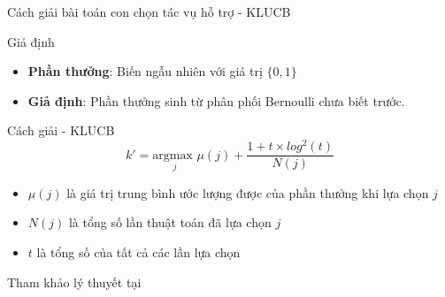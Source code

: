 \begin{frame}{Cách giải bài toán con chọn tác vụ hỗ trợ - KLUCB}
    \begin{block}{Giả định}
        \begin{itemize}
            \item \textbf{Phần thưởng}: Biến ngẫu nhiên với giá trị $\{0, 1\}$
            \item \textbf{Giả định}: Phần thưởng sinh từ phân phối Bernoulli chưa biết trước.
        \end{itemize}
    \end{block}
    \begin{block}{Cách giải - KLUCB}
        \begin{equation}
            k' = \underset{j}{\text{argmax }} \mu(j) + \frac{1 + t \times log^2(t) }{N(j)}
            \label{eq:propose:klucb}
        \end{equation}
        \begin{itemize}
            \item $\mu(j)$ là giá trị trung bình ước lượng được của phần thưởng khi lựa chọn $j$
            \item $N(j)$ là tổng số lần thuật toán đã lựa chọn $j$
            \item $t$ là tổng số của tất cả các lần lựa chọn
        \end{itemize}
    \end{block}
    \begin{block}{Tham khảo lý thuyết tại}
    \end{block}
\end{frame}


